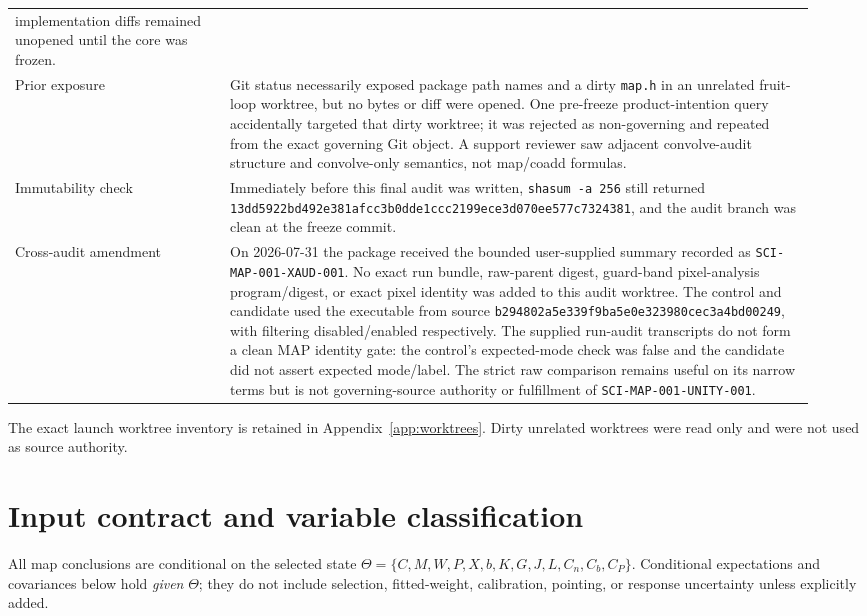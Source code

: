 \documentclass[11pt]{article}
\newcommand{\code}[1]{\nolinkurl{#1}}
\newcommand{\gitsha}[5]{\texttt{#1\allowbreak#2\allowbreak#3\allowbreak#4\allowbreak#5}}
\newcommand{\digest}[8]{\texttt{#1\allowbreak#2\allowbreak#3\allowbreak#4\allowbreak#5\allowbreak#6\allowbreak#7\allowbreak#8}}
\newcommand{\AuditCoreSHA}{\digest{13dd5922}{bd492e38}{1afcc3b0}{15284216}{dde1ccc2}{199ece3d}{070ee577}{c7324381}}
\begin{document}
\begin{longtable}{L{0.25\linewidth}L{0.68\linewidth}}
implementation diffs remained unopened until the core was frozen.\\
Prior exposure & Git status necessarily exposed package path names and a dirty
\code{map.h} in an unrelated fruit-loop worktree, but no bytes or diff were
opened.  One pre-freeze product-intention query accidentally targeted that
dirty worktree; it was rejected as non-governing and repeated from the exact
governing Git object.  A support reviewer saw adjacent convolve-audit structure
and convolve-only semantics, not map/coadd formulas.\\
Immutability check & Immediately before this final audit was written,
\code{shasum -a 256} still returned \AuditCoreSHA, and the audit branch
was clean at the freeze commit.\\
Cross-audit amendment & On 2026-07-31 the package received the bounded
user-supplied summary recorded as \code{SCI-MAP-001-XAUD-001}.  No exact run
bundle, raw-parent digest, guard-band pixel-analysis program/digest, or exact
pixel identity was added to this audit worktree.  The control and candidate
used the executable from source
\gitsha{b294802a}{5e339f9b}{a5e0e323}{980cec3a}{4bd00249}, with filtering
disabled/enabled respectively.  The supplied run-audit transcripts do not form
a clean MAP identity gate: the control's expected-mode check was false and the
candidate did not assert expected mode/label.  The strict raw comparison
remains useful on its narrow terms but is not governing-source authority or
fulfillment of \code{SCI-MAP-001-UNITY-001}.\\
\bottomrule
\end{longtable}

The exact launch worktree inventory is retained in
Appendix~\ref{app:worktrees}.  Dirty unrelated worktrees were read only and
were not used as source authority.

\section{Input contract and variable classification}

All map conclusions are conditional on the selected state
\(\Theta=\{C,M,W,P,X,b,K,G,J,L,C_n,C_b,C_P\}\).  Conditional expectations and covariances below
hold \emph{given} \(\Theta\); they do not include selection, fitted-weight,
calibration, pointing, or response uncertainty unless explicitly added.
\end{document}
